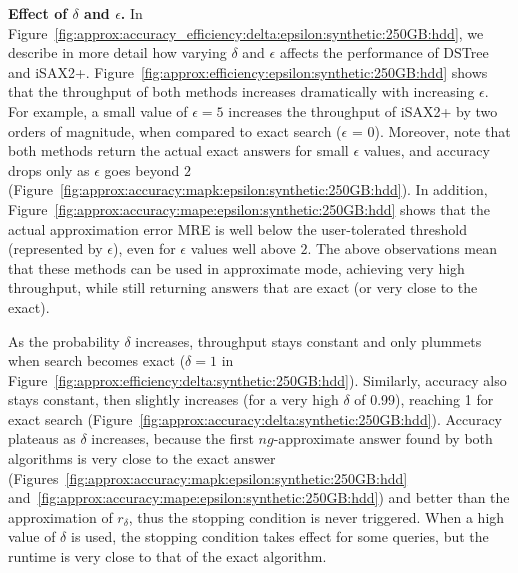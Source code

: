 {{\noindent\textbf{Effect of $\delta$ and $\epsilon$.} 
In Figure~\ref{fig:approx:accuracy_efficiency:delta:epsilon:synthetic:250GB:hdd}, we describe in more detail how varying $\delta$ and $\epsilon$ affects the performance of DSTree and iSAX2+. 
Figure~\ref{fig:approx:efficiency:epsilon:synthetic:250GB:hdd} shows that the throughput of both methods increases dramatically with increasing $\epsilon$. 
For example, a small value of $\epsilon = 5$ increases the throughput of iSAX2+ by two orders of magnitude, when compared to exact search ($\epsilon$ = 0). 
Moreover, note that both methods return the actual exact answers for small $\epsilon$ values, and accuracy drops only as $\epsilon$ goes beyond $2$ (Figure~\ref{fig:approx:accuracy:mapk:epsilon:synthetic:250GB:hdd}).
In addition, Figure~\ref{fig:approx:accuracy:mape:epsilon:synthetic:250GB:hdd} shows that the actual approximation error MRE is well below the user-tolerated threshold (represented by $\epsilon$), even for $\epsilon$ values well above $2$.
The above observations mean that these methods can be used in approximate mode, achieving very high throughput, while still returning answers that are exact (or very close to the exact).

As the probability $\delta$ increases, throughput stays constant and only plummets when search becomes exact ($\delta =1$ in Figure~\ref{fig:approx:efficiency:delta:synthetic:250GB:hdd}).
Similarly, accuracy also stays constant, then slightly increases (for a very high $\delta$ of 0.99), reaching 1 for exact search (Figure~\ref{fig:approx:accuracy:delta:synthetic:250GB:hdd}).
Accuracy plateaus as $\delta$ increases, because the first $ng$-approximate answer found by both algorithms is very close to the exact answer (Figures~\ref{fig:approx:accuracy:mapk:epsilon:synthetic:250GB:hdd} and~\ref{fig:approx:accuracy:mape:epsilon:synthetic:250GB:hdd}) and better than the approximation of $r_\delta$, thus the stopping condition is never triggered. 
When a high value of $\delta$ is used, the stopping condition takes effect for some queries, but the runtime is very close to that of the exact algorithm.

}}
